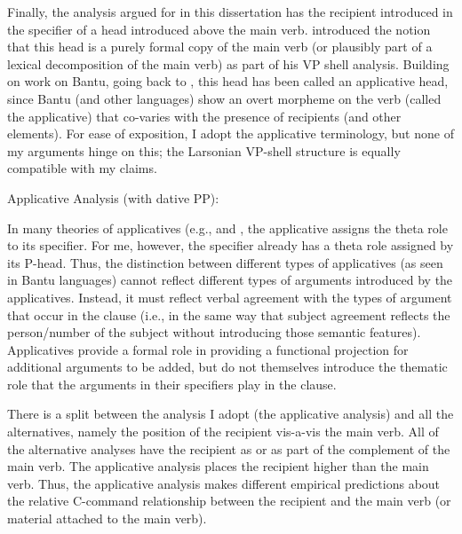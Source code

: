 Finally, the analysis argued for in this dissertation has the recipient introduced in the specifier of a head introduced above the main verb. \cite{Larson.1988} introduced the notion that this head is a purely formal copy of the main verb (or plausibly part of a lexical decomposition of the main verb) as part of his VP shell analysis. Building on work on Bantu, going back to \cite{Baker.1988b}, this head has been called an applicative head, since Bantu (and other languages) show an overt morpheme on the verb (called the applicative) that co-varies with the presence of recipients (and other elements). For ease of exposition, I adopt the applicative terminology, but none of my arguments hinge on this; the Larsonian VP-shell structure is equally compatible with my claims. 

\begin{exe}
	\ex Applicative Analysis (with dative PP):\\
\end{exe}

In many theories of applicatives (e.g., \citealt{Pylkkanen.2008} and \citealt{McGinnis.2001}, the applicative assigns the theta role to its specifier. For me, however, the specifier already has a theta role assigned by its P-head. Thus, the distinction between different types of applicatives (as seen in Bantu languages) cannot reflect different types of arguments introduced by the applicatives. Instead, it must reflect verbal agreement with the types of argument that occur in the clause (i.e., in the same way that subject agreement reflects the person/number of the subject without introducing those semantic features). Applicatives provide a formal role in providing a functional projection for additional arguments to be added, but do not themselves introduce the thematic role that the arguments in their specifiers play in the clause.

There is a split between the analysis I adopt (the applicative analysis) and all the alternatives, namely the position of the recipient vis-a-vis the main verb. All of the alternative analyses have the recipient as or as part of the complement of the main verb. The applicative analysis places the recipient higher than the main verb. Thus, the applicative analysis makes different empirical predictions about the relative C-command relationship between the recipient and the main verb (or material attached to the main verb).

